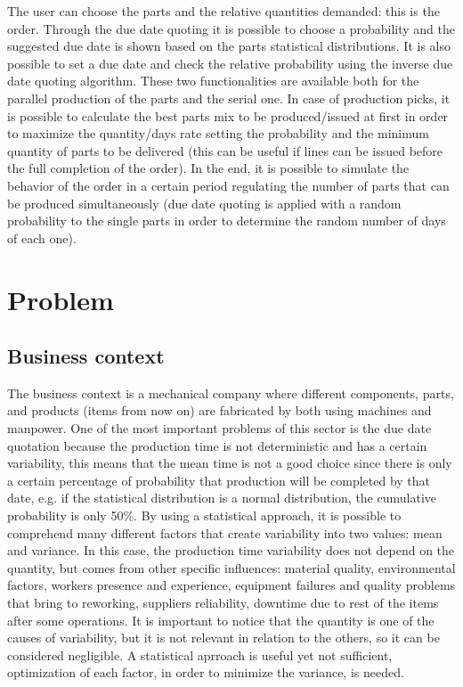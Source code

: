 \documentclass[a4paper,12pt]{article}
\begin{document}
The user can choose the parts and the relative quantities demanded: this is the order. Through the due date quoting it is possible to choose a probability and the suggested due date is shown based on the parts statistical distributions. It is also possible to set a due date and check the relative probability using the inverse due date quoting algorithm. These two functionalities are available both for the parallel production of the parts and the serial one. In case of production picks, it is possible to calculate the best parts mix to be produced/issued at first in order to maximize the quantity/days rate setting the probability and the minimum quantity of parts to be delivered (this can be useful if lines can be issued before the full completion of the order). In the end, it is possible to simulate the behavior of the order in a certain period regulating the number of parts that can be produced simultaneously (due date quoting is applied with a random probability to the single parts in order to determine the random number of days of each one).

\newpage
\section{Problem}
\subsection{Business context}
The business context is a mechanical company where different components, parts, and products (items from now on) are fabricated by both using machines and manpower. One of the most important problems of this sector is the due date quotation because the production time is not deterministic and has a certain variability, this means that the mean time is not a good choice since there is only a certain percentage of probability that production will be completed by that date, e.g. if the statistical distribution is a normal distribution,  the cumulative probability is only 50\%. By using a statistical approach, it is possible to comprehend many different factors that create variability into two values: mean and variance. In this case, the production time variability does not depend on the quantity, but comes from other specific influences: material quality, environmental factors, workers presence and experience, equipment failures and quality problems that bring to reworking, suppliers reliability, downtime due to rest of the items after some operations. It is important to notice that the quantity is one of the causes of variability, but it is not relevant in relation to the others, so it can be considered negligible. A statistical aprroach is useful yet not sufficient, optimization of each factor, in order to minimize the variance, is needed.\\
\end{document}
